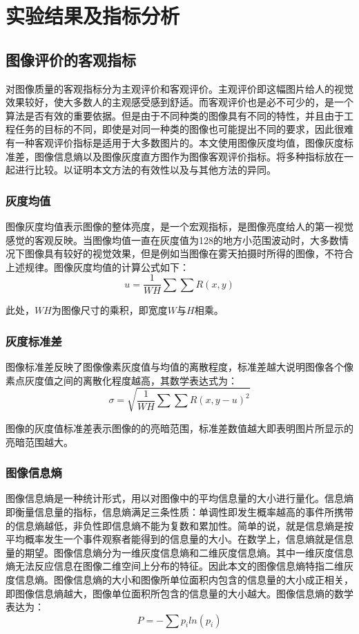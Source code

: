 \chapter{实验结果及指标分析}\label{chap:shiYan}

		\section{图像评价的客观指标}对图像质量的客观指标分为主观评价和客观评价。主观评价即这幅图片给人的视觉效果较好，使大多数人的主观感受感到舒适。而客观评价也是必不可少的，是一个算法是否有效的重要依据。但是由于不同种类的图像具有不同的特性，并且由于工程任务的目标的不同，即使是对同一种类的图像也可能提出不同的要求，因此很难有一种客观评价指标是适用于大多数图片的。本文使用图像灰度均值，图像灰度标准差，图像信息熵以及图像灰度直方图作为图像客观评价指标。将多种指标放在一起进行比较。以证明本文方法的有效性以及与其他方法的异同。
			\subsection{灰度均值}图像灰度均值表示图像的整体亮度，是一个宏观指标，是图像亮度给人的第一视觉感觉的客观反映。当图像均值一直在灰度值为128的地方小范围波动时，大多数情况下图像具有较好的视觉效果，但是例如当图像在雾天拍摄时所得的图像，不符合上述规律。图像灰度均值的计算公式如下：
\begin{equation}	u= \frac{1}{WH} \sum \sum R(x,y) 	\end{equation}	
	
此处，$WH$为图像尺寸的乘积，即宽度$W$与$H$相乘。

			\subsection{灰度标准差}图像标准差反映了图像像素灰度值与均值的离散程度，标准差越大说明图像各个像素点灰度值之间的离散化程度越高，其数学表达式为：
\begin{equation}	 	\sigma =  \sqrt{ \frac{1}{WH} \sum \sum R(x,y-u)^2}	\end{equation}

图像的灰度值标准差表示图像的的亮暗范围，标准差数值越大即表明图片所显示的亮暗范围越大。
			\subsection{图像信息熵}图像信息熵是一种统计形式，用以对图像中的平均信息量的大小进行量化。信息熵即衡量信息量的指标，信息熵满足三条性质：单调性即发生概率越高的事件所携带的信息熵越低，非负性即信息熵不能为复数和累加性。简单的说，就是信息熵是按平均概率发生一个事件观察者能得到的信息量的大小。在数学上，信息熵就是信息量的期望。图像信息熵分为一维灰度信息熵和二维灰度信息熵。其中一维灰度信息熵无法反应信息在图像二维空间上分布的特征。因此本文的图像信息熵特指二维灰度信息熵。图像信息熵的大小和图像所单位面积内包含的信息量的大小成正相关，即图像信息熵越大，图像单位面积所包含的信息量的大小越大。图像信息熵的数学表达为：
\begin{equation}	 	P = - \sum p_iln(p_i)		\end{equation}

